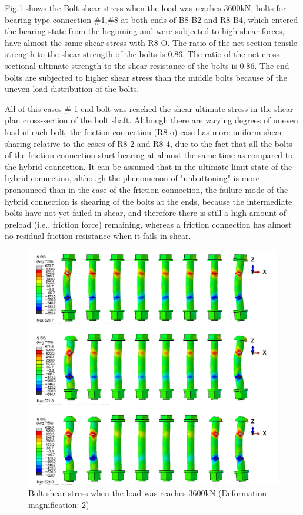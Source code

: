 Fig.\ref{fig-bshearr8} shows the Bolt shear stress when the load was reaches 3600kN, bolts for bearing type connection \#1,\#8 at both ends of B8-B2 and R8-B4, which entered the bearing state from the beginning and were subjected to high shear forces, have almost the same shear stress with R8-O. The ratio of the net section tensile strength to the shear strength of the bolts is 0.86. The ratio of the net cross-sectional ultimate strength to the shear resistance of the bolts is 0.86. The end bolts are subjected to higher shear stress than the middle bolts because of the uneven load distribution of the bolts. 

All of this cases \# 1 end bolt was reached the shear ultimate stress in the shear plan cross-section of the bolt shaft.
Although there are varying degrees of uneven load of each bolt, the friction connection (R8-o) case has more uniform shear sharing relative to the cases of R8-2 and R8-4, due to the fact that all the bolts of the friction connection start bearing at almost the same time as compared to the hybrid connection. It can be assumed that in the ultimate limit state of the hybrid connection, although the phenomenon of "unbuttoning" is more pronounced than in the case of the friction connection, the failure mode of the hybrid connection is shearing of the bolts at the ends, because the intermediate bolts have not yet failed in shear, and therefore there is still a high amount of preload (i.e., friction force) remaining, whereas a friction connection has almost no residual friction resistance when it fails in shear.

\begin{figure}[htbp]
    \centering
    \includegraphics[width=\linewidth]{imgs/ch5/bshear_R8.png}
    \caption{Bolt shear stress when the load was reaches 3600kN (Deformation magnification: 2) }
    \label{fig-bshearr8}
\end{figure}

